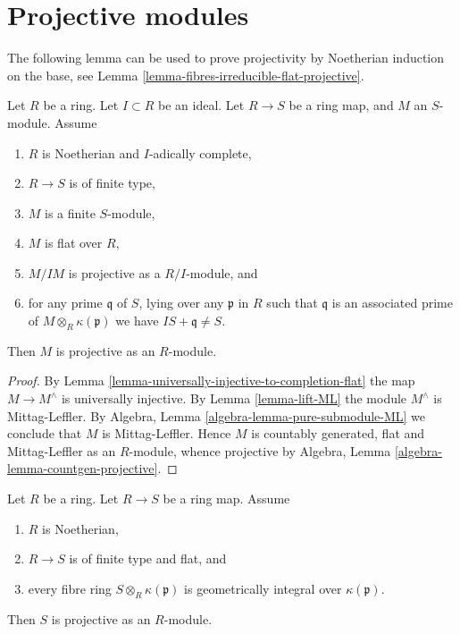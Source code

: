 \section{Projective modules}
\label{section-projective}

\noindent
The following lemma can be used to prove projectivity by
Noetherian induction on the base, see
Lemma \ref{lemma-fibres-irreducible-flat-projective}.

\begin{lemma}
\label{lemma-flat-pure-over-complete-projective}
Let $R$ be a ring.
Let $I \subset R$ be an ideal.
Let $R \to S$ be a ring map, and $M$ an $S$-module.
Assume
\begin{enumerate}
\item $R$ is Noetherian and $I$-adically complete,
\item $R \to S$ is of finite type,
\item $M$ is a finite $S$-module,
\item $M$ is flat over $R$,
\item $M/IM$ is projective as a $R/I$-module, and
\item for any prime $\mathfrak q$ of $S$, lying over any $\mathfrak p$ in $R$
such that $\mathfrak q$ is an associated prime of
$M \otimes_R \kappa(\mathfrak p)$ we have $IS + \mathfrak q \not = S$.
\end{enumerate}
Then $M$ is projective as an $R$-module.
\end{lemma}

\begin{proof}
By
Lemma \ref{lemma-universally-injective-to-completion-flat}
the map $M \to M^\wedge$ is universally injective.
By
Lemma \ref{lemma-lift-ML}
the module $M^\wedge$ is Mittag-Leffler.
By
Algebra, Lemma \ref{algebra-lemma-pure-submodule-ML}
we conclude that $M$ is Mittag-Leffler.
Hence $M$ is countably generated, flat and Mittag-Leffler as an $R$-module,
whence projective by
Algebra, Lemma \ref{algebra-lemma-countgen-projective}.
\end{proof}

\begin{lemma}
\label{lemma-fibres-irreducible-flat-projective}
Let $R$ be a ring.
Let $R \to S$ be a ring map.
Assume
\begin{enumerate}
\item $R$ is Noetherian,
\item $R \to S$ is of finite type and flat, and
\item every fibre ring $S \otimes_R \kappa(\mathfrak p)$ is
geometrically integral over $\kappa(\mathfrak p)$.
\end{enumerate}
Then $S$ is projective as an $R$-module.
\end{lemma}

